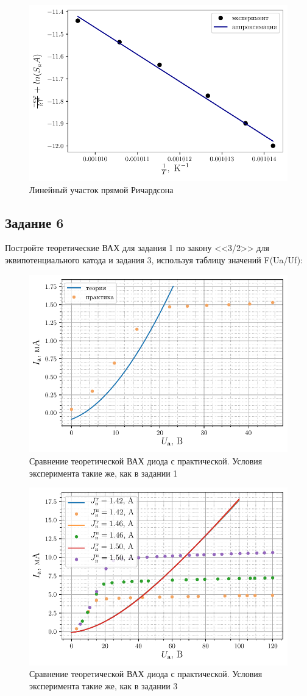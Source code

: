 \begin{figure}[H]
	\centering
	\includegraphics[width=0.75\linewidth]{scripts/richardson}
	\caption{Линейный участок прямой Ричардсона}
	\label{fig:richardson}
\end{figure}

\subsection{Задание 6}
 Постройте теоретические ВАХ для задания 1 по закону <<3/2>> для эквипотенциального катода и задания 3, используя таблицу значений F(Ua/Uf):
 \begin{figure}[H]
	\centering
    \includegraphics[width=0.65\linewidth]{scripts/fig5}
	\caption{Сравнение теоретической ВАХ диода с практической. Условия
        эксперимента такие
    же, как в задании 1}
	\label{fig:21}
\end{figure}

 \begin{figure}[H]
	\centering
    \includegraphics[width=0.65\linewidth]{scripts/fig6}
	\caption{Сравнение теоретической ВАХ диода с практической. Условия
        эксперимента такие
    же, как в задании 3}
	\label{fig:22}
\end{figure}
